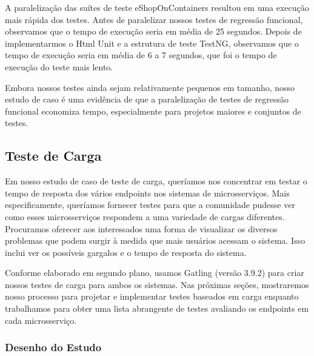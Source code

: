 \begin{tabela}[h]
\begin{tabela}[!t]
A paralelização das suítes de teste eShopOnContainers resultou em uma execução mais rápida dos testes. Antes de paralelizar nossos testes de regressão funcional, observamos que o tempo de execução seria em média de 25 segundos. Depois de implementarmos o Html Unit e a estrutura de teste TestNG, observamos que o tempo de execução seria em média de 6 a 7 segundos, que foi o tempo de execução do teste mais lento.

Embora nossos testes ainda sejam relativamente pequenos em tamanho, nosso estudo de caso é uma evidência de que a paralelização de testes de regressão funcional economiza tempo, especialmente para projetos maiores e conjuntos de testes.

\subsection{Teste de Carga}

Em nosso estudo de caso de teste de carga, queríamos nos concentrar em testar o tempo de resposta dos vários endpoints nos sistemas de microsserviços. Mais especificamente, queríamos fornecer testes para que a comunidade pudesse ver como esses microsserviços respondem a uma variedade de cargas diferentes. Procuramos oferecer aos interessados uma forma de visualizar os diversos problemas que podem surgir à medida que mais usuários acessam o sistema. Isso inclui ver os possíveis gargalos e o tempo de resposta do sistema.

Conforme elaborado em segundo plano, usamos Gatling (versão 3.9.2) para criar nossos testes de carga para ambos os sistemas. Nas próximas seções, mostraremos nosso processo para projetar e implementar testes baseados em carga enquanto trabalhamos para obter uma lista abrangente de testes avaliando os endpoints em cada microsserviço.


\subsubsection{Desenho do Estudo}


\end{tabela}
\end{tabela}
